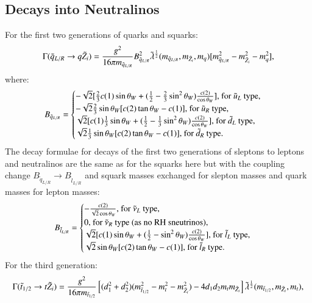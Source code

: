 \documentclass[final,3p,times,pdflatex]{elsarticle}
\begin{document}
\subsection{Decays into Neutralinos}
For the first two generations of quarks and squarks:
\begin{equation} \label{qLRqneutNMSSM}
\Gamma(\tilde{q}_{L/R} \rightarrow q \tilde{Z}_i) = {g^2 \over 16\pi m_{\tilde{q}_{L/R}}} B_{\tilde{q}_{L/R}}^2 \tilde{\lambda}^{1 \over 2}(m_{\tilde{q}_{L/R}},m_{\tilde{Z}_i},m_q) [m_{\tilde{q}_{L/R}}^2 - m_{\tilde{Z}_i}^2 - m_{q}^2],
\end{equation}
where:
\begin{equation}
B_{\tilde{q}_{L/R}} = \begin{cases}
	-\sqrt{2}[{2 \over 3}c(1)\sin\theta_W + ({1 \over 2} - {2 \over 3}\sin^2 \theta_W){c(2) \over \cos\theta_W}] $, for $\tilde{u}_L$ type, $ \\
	-\sqrt{2} {2 \over 3} \sin\theta_W [c(2) \tan\theta_W - c(1)] $, for $\tilde{u}_R$ type, $ \\
	\sqrt{2}[c(1){1 \over 3}\sin\theta_W + ({1 \over 2} - {1 \over 3}\sin^2 \theta_W){c(2) \over \cos\theta_W}] $, for $\tilde{d}_L$ type, $ \\
	\sqrt{2} {1 \over 3} \sin\theta_W [c(2)\tan\theta_W - c(1)] $, for $\tilde{d}_R$ type$.\\
	\end{cases}
\end{equation}
The decay formulae for decays of the first two generations of sleptons to leptons and neutralinos are the same as for the squarks here but with the coupling change $B_{\tilde{q}_{L/R}} \rightarrow B_{\tilde{l}_{L/R}}$ and squark masses exchanged for slepton masses and quark masses for lepton masses:
\begin{equation}
B_{\tilde{l}_{L/R}} = \begin{cases}
	-{c(2) \over \sqrt{2} \cos\theta_W} $, for $\tilde{\nu}_L$ type, $ \\
	0 $, for $\tilde{\nu}_R$ type (as no RH sneutrinos), $ \\
	\sqrt{2}[c(1)\sin\theta_W + ({1 \over 2} - \sin^2 \theta_W){c(2) \over \cos\theta_W}] $, for $\tilde{l}_L$ type, $ \\
	\sqrt{2} \sin\theta_W [c(2)\tan\theta_W - c(1)] $, for $\tilde{l}_R$ type. $\\
	\end{cases}
\end{equation}
For the third generation:
\begin{equation} \label{sttneutNMSSM}
\Gamma(\tilde{t}_{1/2} \rightarrow t \tilde{Z}_i) = {g^2 \over 16 \pi m_{\tilde{t}_{1/2}}}\left[(d_{1}^2 + d_{2}^2)(m_{\tilde{t}_{1/2}}^2 - m_{t}^2 - m_{\tilde{Z}_i}^2) - 4d_{1}d_{2}m_{t}m_{\tilde{Z}_i}\right]\tilde{\lambda}^{1 \over 2}(m_{\tilde{t}_{1/2}},m_{\tilde{Z}_i},m_{t}),
\end{equation}
\end{document}
